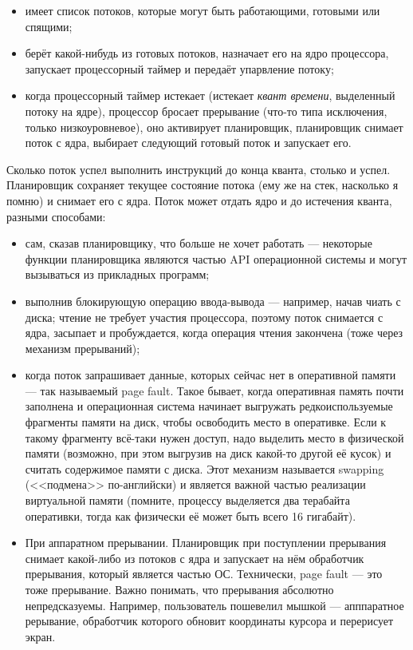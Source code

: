 \documentclass[a5paper]{article}
\begin{document}
\begin{itemize}
    \item имеет список потоков, которые могут быть работающими, готовыми или спящими;
    \item берёт какой-нибудь из готовых потоков, назначает его на ядро процессора, запускает процессорный таймер и передаёт упарвление потоку;
    \item когда процессорный таймер истекает (истекает \textit{квант времени}, выделенный потоку на ядре), процессор бросает прерывание (что-то типа исключения, только низкоуровневое), оно активирует планировщик, планировщик снимает поток с ядра, выбирает следующий готовый поток и запускает его.
\end{itemize}

Сколько поток успел выполнить инструкций до конца кванта, столько и успел. Планировщик сохраняет текущее состояние потока (ему же на стек, насколько я помню) и снимает его с ядра. Поток может отдать ядро и до истечения кванта, разными способами:

\begin{itemize}
    \item сам, сказав планировщику, что больше не хочет работать --- некоторые функции планировщика являются частью API операционной системы и могут вызываться из прикладных программ;
    \item выполнив блокирующую операцию ввода-вывода --- например, начав чиать с диска; чтение не требует участия процессора, поэтому поток снимается с ядра, засыпает и пробуждается, когда операция чтения закончена (тоже через механизм прерываний);
    \item когда поток запрашивает данные, которых сейчас нет в оперативной памяти --- так называемый page fault. Такое бывает, когда оперативная память почти заполнена и операционная система начинает выгружать редкоиспользуемые фрагменты памяти на диск, чтобы освободить место в оперативке. Если к такому фрагменту всё-таки нужен доступ, надо выделить место в физической памяти (возможно, при этом выгрузив на диск какой-то другой её кусок) и считать содержимое памяти с диска. Этот механизм называется swapping (<<подмена>> по-английски) и является важной частью реализации виртуальной памяти (помните, процессу выделяется два терабайта оперативки, тогда как физически её может быть всего 16 гигабайт).
    \item При аппаратном прерывании. Планировщик при поступлении прерывания снимает какой-либо из потоков с ядра и запускает на нём обработчик прерывания, который является частью ОС. Технически, page fault --- это тоже прерывание. Важно понимать, что прерывания абсолютно непредсказуемы. Например, пользователь пошевелил мышкой --- апппаратное рерывание, обработчик которого обновит координаты курсора и перерисует экран.
\end{itemize}
\end{document}
